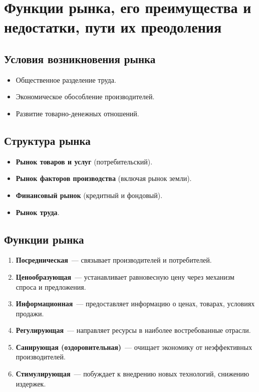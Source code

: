 \documentclass[12pt]{article}
\begin{document}
	\section{Функции рынка, его преимущества и недостатки, пути их преодоления}
	
	\subsection{Условия возникновения рынка}
	\begin{itemize}
		\item Общественное разделение труда.
		\item Экономическое обособление производителей.
		\item Развитие товарно-денежных отношений.
	\end{itemize}
	
	\subsection{Структура рынка}
	\begin{itemize}
		\item \textbf{Рынок товаров и услуг} (потребительский).
		\item \textbf{Рынок факторов производства} (включая рынок земли).
		\item \textbf{Финансовый рынок} (кредитный и фондовый).
		\item \textbf{Рынок труда}.
	\end{itemize}
	
	\subsection{Функции рынка}
	\begin{enumerate}
		\item \textbf{Посредническая}~--- связывает производителей и потребителей.
		\item \textbf{Ценообразующая}~--- устанавливает равновесную цену через механизм спроса и предложения.
		\item \textbf{Информационная}~--- предоставляет информацию о ценах, товарах, условиях продажи.
		\item \textbf{Регулирующая}~--- направляет ресурсы в наиболее востребованные отрасли.
		\item \textbf{Санирующая (оздоровительная)}~--- очищает экономику от неэффективных производителей.
		\item \textbf{Стимулирующая}~--- побуждает к внедрению новых технологий, снижению издержек.
	\end{enumerate}
	
\end{document}
